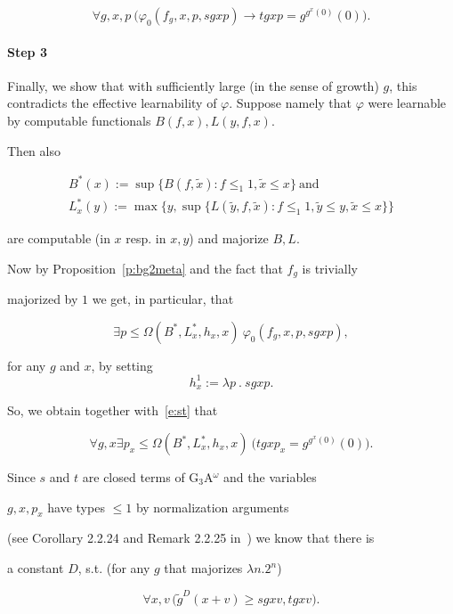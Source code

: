\documentclass[1p]{elsarticle}
\newcommand{\ba}{\begin{array}} \newcommand{\ea}{\end{array}}
\newcommand{\be}[1][{e:\arabic{equation}}] { \begin{equation}\label{#1} }
\newcommand{\ee} { \end{equation} }
\theoremstyle{plain}
\theoremstyle{definition}
\theoremstyle{remark}
\renewenvironment{proof}[1][]{\noindent{\bf Proof{#1}. }}{\nopagebreak[4]{\hspace*{\fill}


  $\Box$              %

 }{\vspace{2ex}}}
\renewcommand{\phi}{\varphi}
\theoremstyle{definition}
\begin{document}
{\begin{proof}
\be[e:st]

\forall g,x,p\ \big(\phi_0(f_g,x,p,sgxp)\rightarrow tgxp=g^{g^{x}(0)}(0)\big).

\ee

\paragraph{Step 3} Finally, we show that with sufficiently large (in the sense of growth) $g$, this contradicts the effective learnability of $\phi$. Suppose namely that $\phi$ were learnable by computable functionals $B(f,x),L(y,f,x).$ 

Then also 

\[ \ba{l} B^*(x):=\sup \{ B(f,\tilde{x}): f\le_1 1, \tilde{x}\le x\} \ 

\mbox{and} \\ 

L^*_x(y):=\max\{ y,\sup \{ L(\tilde{y},f,\tilde{x}): f\le_1 1,\tilde{y}\le y,

\tilde{x}\le x\}\}\ea \] 

are computable (in $x$ resp. in $x,y$) and majorize $B,L.$ 

Now by Proposition~\ref{p:bg2meta} and the fact that $f_g$ is trivially 

majorized by $1$ we get, in particular, that 

\[

\exists p\leq \Omega(B^*,L^*_x,h_x,x)\ \phi_0(f_g,x,p, sgxp),

\]

for any $g$ and $x$, by setting \[h^1_x:=\lambda p\ .\ sgxp.\]

So, we obtain together with~\eqref{e:st} that

\[

\forall g,x \exists p_x\leq \Omega(B^*,L^*_x,h_x,x)\ 

\big( tgxp_x =g^{g^{x}(0)}(0)\big).

\]

Since $s$ and $t$ are closed terms of G$_3$A$^\omega$ and the variables 

$g,x,p_x$ have types $\le 1$ by normalization arguments

(see Corollary 2.2.24 and Remark 2.2.25 in~\cite{Kohlenbach(lowrate)}) we know that there is 

a constant $D$, s.t. (for any $g$ that majorizes $\lambda n.2^n$) 

\[ \forall x,v\, \big( \tilde{g}^D(x+v)\ge sgxv,tgxv\big).\] 


\end{proof}}
\end{document}
